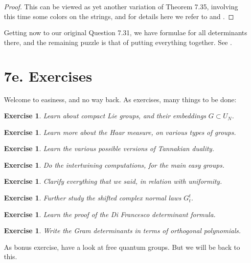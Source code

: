 \documentclass[12pt]{amsbook}
\newtheorem{exercise}[theorem]{Exercise}
\begin{document}
\begin{proof}
This can be viewed as yet another variation of Theorem 7.35, involving this time some colors on the strings, and for details here we refer to \cite{dif} and \cite{bcu}.
\end{proof}

Getting now to our original Question 7.31, we have formulae for all determinants there, and the remaining puzzle is that of putting everything together. See \cite{bcu}.

\section*{7e. Exercises}

Welcome to easiness, and no way back. As exercises, many things to be done:

\begin{exercise}
Learn about compact Lie groups, and their embeddings $G\subset U_N$.
\end{exercise}

\begin{exercise}
Learn more about the Haar measure, on various types of groups.
\end{exercise}

\begin{exercise}
Learn the various possible versions of Tannakian duality.
\end{exercise}

\begin{exercise}
Do the intertwining computations, for the main easy groups.
\end{exercise}

\begin{exercise}
Clarify everything that we said, in relation with uniformity.
\end{exercise}

\begin{exercise}
Further study the shifted complex normal laws $G_t^t$.
\end{exercise}

\begin{exercise}
Learn the proof of the Di Francesco determinant formula.
\end{exercise}

\begin{exercise}
Write the Gram determinants in terms of orthogonal polynomials.
\end{exercise}

As bonus exercise, have a look at free quantum groups. But we will be back to this.
\end{document}
